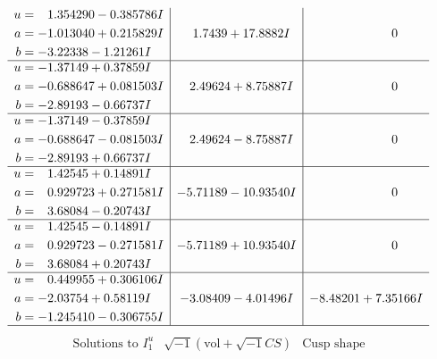 \documentclass[1p]{elsarticle_modified}
\theoremstyle{definition}
\newcommand{\I}{\sqrt{-1}}
\begin{document}
$$\begin{array}{c|c|c}
\begin{aligned}
u &= \phantom{-}1.354290 - 0.385786 I \\
a &= -1.013040 + 0.215829 I \\
b &= -3.22338 - 1.21261 I\end{aligned}
 & \phantom{-}1.7439 + 17.8882 I & \phantom{-0.000000 } 0 \\ \hline\begin{aligned}
u &= -1.37149 + 0.37859 I \\
a &= -0.688647 + 0.081503 I \\
b &= -2.89193 - 0.66737 I\end{aligned}
 & \phantom{-}2.49624 + 8.75887 I & \phantom{-0.000000 } 0 \\ \hline\begin{aligned}
u &= -1.37149 - 0.37859 I \\
a &= -0.688647 - 0.081503 I \\
b &= -2.89193 + 0.66737 I\end{aligned}
 & \phantom{-}2.49624 - 8.75887 I & \phantom{-0.000000 } 0 \\ \hline\begin{aligned}
u &= \phantom{-}1.42545 + 0.14891 I \\
a &= \phantom{-}0.929723 + 0.271581 I \\
b &= \phantom{-}3.68084 - 0.20743 I\end{aligned}
 & -5.71189 - 10.93540 I & \phantom{-0.000000 } 0 \\ \hline\begin{aligned}
u &= \phantom{-}1.42545 - 0.14891 I \\
a &= \phantom{-}0.929723 - 0.271581 I \\
b &= \phantom{-}3.68084 + 0.20743 I\end{aligned}
 & -5.71189 + 10.93540 I & \phantom{-0.000000 } 0 \\ \hline\begin{aligned}
u &= \phantom{-}0.449955 + 0.306106 I \\
a &= -2.03754 + 0.58119 I \\
b &= -1.245410 - 0.306755 I\end{aligned}
 & -3.08409 - 4.01496 I & -8.48201 + 7.35166 I\\
 \hline 
 \end{array}$$\newpage$$\begin{array}{c|c|c}  
\text{Solutions to }I^u_{1}& \I (\text{vol} + \sqrt{-1}CS) & \text{Cusp shape}\\
 \hline 
\begin{aligned}

\end{aligned}
\end{array}$$
\end{document}
